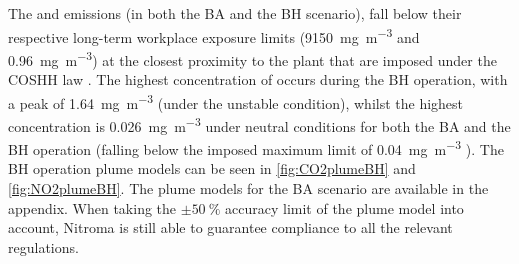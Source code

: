 The  and  emissions (in both the BA and the BH scenario), fall below their respective long-term workplace exposure limits (\SI{9150}{\mg\per\cubic\m} and \SI{0.96}{\mg\per\cubic\m}) at the closest proximity to the plant that are imposed under the COSHH law \cite{great_britain_health_and_safety_executive_workplace_2020}. The highest concentration of  occurs during the BH operation, with a peak of \SI{1.64}{\mg\per\cubic\m}  (under the unstable condition), whilst the highest  concentration is \SI{0.026}{\mg\per\cubic\m} under neutral conditions for both the BA and the BH operation (falling below the imposed maximum limit of \SI{0.04}{\mg\per\cubic\m} \cite{european_commission_standards_nodate}). 
The BH operation plume models can be seen in \ref{fig:CO2plumeBH} and \ref{fig:NO2plumeBH}. The plume models for the BA scenario are available in the appendix. When taking the $\pm \SI{50}{\percent}$ accuracy limit of the plume model into account, Nitroma is still able to guarantee compliance to all the relevant regulations.  

